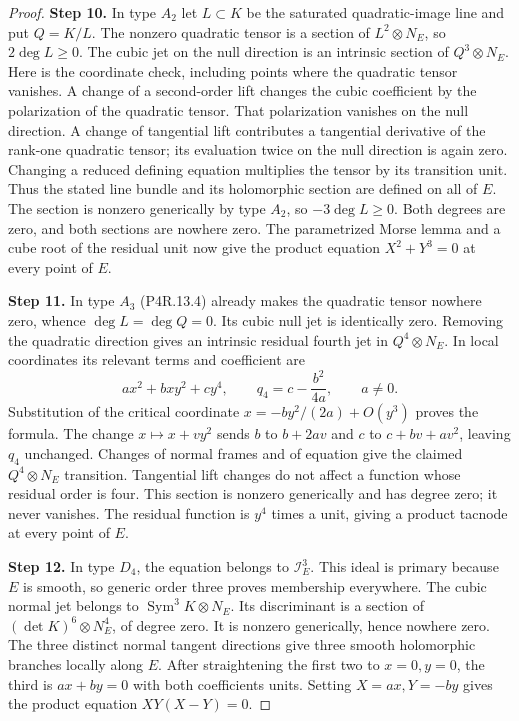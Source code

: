 \begin{proof}
\noindent\textbf{Step 10.} In type $A_2$ let $L\subset K$ be the saturated
quadratic-image line and put $Q=K/L$. The nonzero
quadratic tensor is a section of
$L^2\otimes N_E$, so $2\deg L\ge0$.
The cubic jet on the null direction is an
intrinsic section of $Q^3\otimes N_E$.
Here is the coordinate check, including points
where the quadratic tensor vanishes. A change
of a second-order lift changes the cubic
coefficient by the polarization of the
quadratic tensor. That polarization vanishes
on the null direction. A change of tangential
lift contributes a tangential derivative of
the rank-one quadratic tensor; its evaluation
twice on the null direction is again zero.
Changing a reduced defining equation multiplies
the tensor by its transition unit. Thus the
stated line bundle and its holomorphic section
are defined on all of $E$. The section is
nonzero generically by type $A_2$, so
$-3\deg L\ge0$. Both degrees are zero,
and both sections are nowhere zero. The
parametrized Morse lemma and a cube root
of the residual unit now give the product
equation $X^2+Y^3=0$ at every point of $E$.

\noindent\textbf{Step 11.} In type $A_3$ (P4R.13.4) already makes the
quadratic tensor nowhere zero, whence
$\deg L=\deg Q=0$. Its cubic null jet is
identically zero. Removing the quadratic
direction gives an intrinsic residual fourth
jet in $Q^4\otimes N_E$. In local coordinates
its relevant terms and coefficient are
\[
 a x^2+bxy^2+cy^4,
 \qquad q_4=c-\frac{b^2}{4a},\qquad a\ne0.                 \tag{P4R.13.5}
\]
Substitution of the critical coordinate
$x=-by^2/(2a)+O(y^3)$ proves the formula.
The change $x\mapsto x+vy^2$ sends $b$ to
$b+2av$ and $c$ to $c+bv+av^2$, leaving
$q_4$ unchanged. Changes of normal frames
and of equation give the claimed
$Q^4\otimes N_E$ transition. Tangential
lift changes do not affect a function
whose residual order is four. This section
is nonzero generically and has degree zero;
it never vanishes. The residual function
is $y^4$ times a unit, giving a product
tacnode at every point of $E$.

\noindent\textbf{Step 12.} In type $D_4$, the equation belongs to
$\mathcal I_E^3$. This ideal is primary
because $E$ is smooth, so generic order
three proves membership everywhere.
The cubic normal jet belongs to
$\operatorname{Sym}^3K\otimes N_E$.
Its discriminant is a section of
$(\det K)^6\otimes N_E^4$, of degree
zero. It is nonzero generically, hence
nowhere zero. The three distinct normal
tangent directions give three smooth
holomorphic branches locally along $E$.
After straightening the first two to
$x=0,y=0$, the third is $ax+by=0$
with both coefficients units. Setting
$X=ax,Y=-by$ gives the product equation
$XY(X-Y)=0$.


\end{proof}
